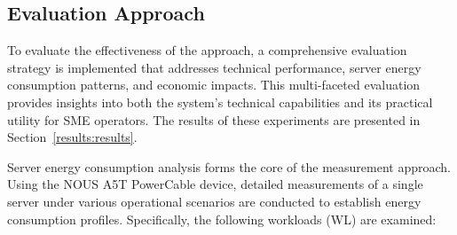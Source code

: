 \subsection{Evaluation Approach}
\label{methodology:evaluation-approach}
To evaluate the effectiveness of the approach, a comprehensive evaluation strategy is implemented that addresses technical performance, server energy consumption patterns, and economic impacts. This multi-faceted evaluation provides insights into both the system's technical capabilities and its practical utility for SME operators. The results of these experiments are presented in Section~\ref{results:results}.

Server energy consumption analysis forms the core of the measurement approach. Using the NOUS A5T PowerCable device, detailed measurements of a single server under various operational scenarios are conducted to establish energy consumption profiles. Specifically, the following workloads (WL) are examined:

